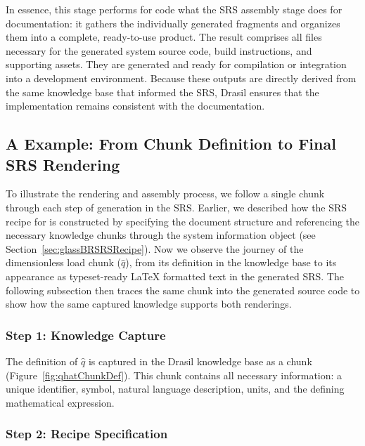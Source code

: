 In essence, this stage performs for code what the SRS assembly stage does for 
documentation: it gathers the individually generated fragments and organizes 
them into a complete, ready-to-use product. The result comprises all files 
necessary for the generated system source code, build instructions, and 
supporting assets. They are generated and ready for compilation or integration 
into a development environment. Because these outputs are directly derived from 
the same knowledge base that informed the SRS, Drasil ensures that the 
implementation remains consistent with the documentation.


\subsection{A \gb{} Example: From Chunk Definition to Final SRS Rendering}

To illustrate the rendering and assembly process, we follow a single chunk 
through each step of generation in the \gb{} SRS. Earlier, we 
described how the SRS recipe for \gb{} is constructed by specifying the 
document structure and referencing the necessary knowledge chunks through the 
system information object (see Section~\ref{sec:glassBRSRSRecipe}). Now we 
observe the journey of the dimensionless load chunk ($\hat{q}$), from 
its definition in the knowledge base to its appearance as typeset-ready \LaTeX{}
formatted text in the generated SRS. The following subsection then traces the 
same chunk into the generated source code to show how the same captured 
knowledge supports both renderings.

\subsubsection{Step 1: Knowledge Capture}

The definition of $\hat{q}$ is captured in the Drasil knowledge base as a 
chunk (Figure~\ref{fig:qhatChunkDef}). This chunk contains all necessary 
information: a unique identifier, symbol, natural language description, units, 
and the defining mathematical expression.


\subsubsection{Step 2: Recipe Specification}

